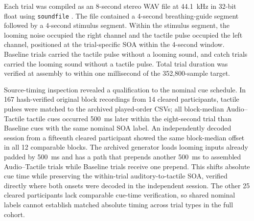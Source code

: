 Each trial was compiled as an 8-second stereo WAV file at 44.1~kHz in 32-bit float using \texttt{soundfile} \citep{sounddevice_python}. The file contained a 4-second breathing-guide segment followed by a 4-second stimulus segment. Within the stimulus segment, the looming noise occupied the right channel and the tactile pulse occupied the left channel, positioned at the trial-specific SOA within the 4-second window. Baseline trials carried the tactile pulse without a looming sound, and catch trials carried the looming sound without a tactile pulse. Total trial duration was verified at assembly to within one millisecond of the 352{,}800-sample target.

Source-timing inspection revealed a qualification to the nominal cue schedule. In 167 hash-verified original block recordings from 14 cleared participants, tactile pulses were matched to the archived played-order CSVs; all block-median Audio--Tactile tactile cues occurred 500~ms later within the eight-second trial than Baseline cues with the same nominal SOA label. An independently decoded session from a fifteenth cleared participant showed the same block-median offset in all 12 comparable blocks. The archived generator loads looming inputs already padded by 500~ms and has a path that prepends another 500~ms to assembled Audio--Tactile trials while Baseline trials receive one prepend. This shifts absolute cue time while preserving the within-trial auditory-to-tactile SOA, verified directly where both onsets were decoded in the independent session. The other 25 cleared participants lack comparable cue-time verification, so shared nominal labels cannot establish matched absolute timing across trial types in the full cohort.

